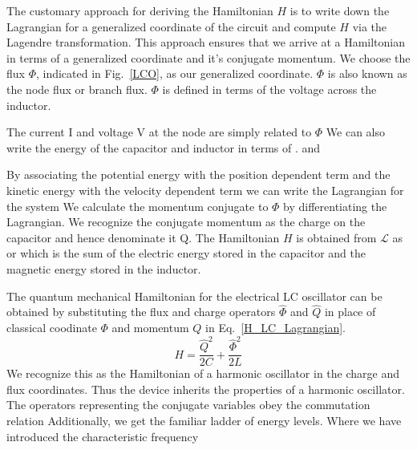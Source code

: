 The customary approach for deriving the Hamiltonian $H$ is to write down the Lagrangian for a generalized coordinate of the circuit and compute $H$ via the Lagendre transformation.
This approach ensures that we arrive at a Hamiltonian in terms of a generalized coordinate and it's conjugate momentum.
We choose the flux $\Phi$, indicated in Fig.~\ref{LCO}, as our generalized coordinate.  $\Phi$ is also known as the node flux or branch flux.  $\Phi$ is defined in terms of the voltage across the inductor.

\noindent
The current I and voltage V at the node are simply related to $\Phi$
We can also write the energy of the capacitor and inductor in terms of \Phi.
and

\noindent
By associating the potential energy with the position dependent term and the kinetic energy with the velocity dependent term we can write the Lagrangian for the system
We calculate the momentum conjugate to $\Phi$ by differentiating the Lagrangian.
We recognize the conjugate momentum as the charge on the capacitor and hence denominate it Q.
The Hamiltonian $H$ is obtained from $\mathcal{L}$ as
or
which is the sum of the electric energy stored in the capacitor and the magnetic energy stored in the inductor.

The quantum mechanical Hamiltonian for the electrical LC oscillator can be obtained by substituting the flux and charge operators $\hat{\Phi}$ and $\hat{Q}$
in place of classical coodinate $\Phi$ and momentum $Q$ in Eq.~\ref{H_LC_Lagrangian}.
\begin{equation}
    H = \frac{\hat{Q}^2}{2C} + \frac{\hat{\Phi}^2}{2L}
\end{equation}
We recognize this as the Hamiltonian of a harmonic oscillator in the charge and flux coordinates.
Thus the device inherits the properties of a harmonic oscillator.
The operators representing the conjugate variables obey the commutation relation
Additionally, we get the familiar ladder of energy levels.
Where we have introduced the characteristic frequency


